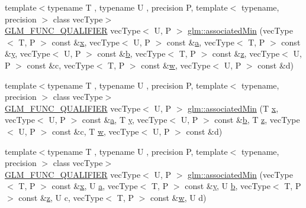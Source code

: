 \begin{DoxyCompactItemize}
{\footnotesize template$<$typename T , typename U , precision P, template$<$ typename, precision $>$ class vec\+Type$>$ }\\\mbox{\hyperlink{setup_8hpp_a33fdea6f91c5f834105f7415e2a64407}{G\+L\+M\+\_\+\+F\+U\+N\+C\+\_\+\+Q\+U\+A\+L\+I\+F\+I\+ER}} vec\+Type$<$ U, P $>$ \mbox{\hyperlink{group__gtx__associated__min__max_ga88e031f22b80215505928900d3dde549}{glm\+::associated\+Min}} (vec\+Type$<$ T, P $>$ const \&\mbox{\hyperlink{glad_8h_a92d0386e5c19fb81ea88c9f99644ab1d}{x}}, vec\+Type$<$ U, P $>$ const \&\mbox{\hyperlink{glad_8h_ac8729153468b5dcf13f971b21d84d4e5}{a}}, vec\+Type$<$ T, P $>$ const \&\mbox{\hyperlink{glad_8h_a66ddd433d2cacfe27f5906b7e86faeed}{y}}, vec\+Type$<$ U, P $>$ const \&\mbox{\hyperlink{glad_8h_a6eba317e3cf44d6d26c04a5a8f197dcb}{b}}, vec\+Type$<$ T, P $>$ const \&\mbox{\hyperlink{glad_8h_acb78bf1972d3eaf07da34ff2e0a2f133}{z}}, vec\+Type$<$ U, P $>$ const \&c, vec\+Type$<$ T, P $>$ const \&\mbox{\hyperlink{glad_8h_a1d0296e9e835f2e1ee17634af95fc1ec}{w}}, vec\+Type$<$ U, P $>$ const \&d)
\item 
{\footnotesize template$<$typename T , typename U , precision P, template$<$ typename, precision $>$ class vec\+Type$>$ }\\\mbox{\hyperlink{setup_8hpp_a33fdea6f91c5f834105f7415e2a64407}{G\+L\+M\+\_\+\+F\+U\+N\+C\+\_\+\+Q\+U\+A\+L\+I\+F\+I\+ER}} vec\+Type$<$ U, P $>$ \mbox{\hyperlink{group__gtx__associated__min__max_ga0f63b0dce5a5c3242cc6d9847e7d14f1}{glm\+::associated\+Min}} (T \mbox{\hyperlink{glad_8h_a92d0386e5c19fb81ea88c9f99644ab1d}{x}}, vec\+Type$<$ U, P $>$ const \&\mbox{\hyperlink{glad_8h_ac8729153468b5dcf13f971b21d84d4e5}{a}}, T \mbox{\hyperlink{glad_8h_a66ddd433d2cacfe27f5906b7e86faeed}{y}}, vec\+Type$<$ U, P $>$ const \&\mbox{\hyperlink{glad_8h_a6eba317e3cf44d6d26c04a5a8f197dcb}{b}}, T \mbox{\hyperlink{glad_8h_acb78bf1972d3eaf07da34ff2e0a2f133}{z}}, vec\+Type$<$ U, P $>$ const \&c, T \mbox{\hyperlink{glad_8h_a1d0296e9e835f2e1ee17634af95fc1ec}{w}}, vec\+Type$<$ U, P $>$ const \&d)
\item 
{\footnotesize template$<$typename T , typename U , precision P, template$<$ typename, precision $>$ class vec\+Type$>$ }\\\mbox{\hyperlink{setup_8hpp_a33fdea6f91c5f834105f7415e2a64407}{G\+L\+M\+\_\+\+F\+U\+N\+C\+\_\+\+Q\+U\+A\+L\+I\+F\+I\+ER}} vec\+Type$<$ U, P $>$ \mbox{\hyperlink{group__gtx__associated__min__max_ga00a949fd345f4b31b259f033d3ab4a1c}{glm\+::associated\+Min}} (vec\+Type$<$ T, P $>$ const \&\mbox{\hyperlink{glad_8h_a92d0386e5c19fb81ea88c9f99644ab1d}{x}}, U \mbox{\hyperlink{glad_8h_ac8729153468b5dcf13f971b21d84d4e5}{a}}, vec\+Type$<$ T, P $>$ const \&\mbox{\hyperlink{glad_8h_a66ddd433d2cacfe27f5906b7e86faeed}{y}}, U \mbox{\hyperlink{glad_8h_a6eba317e3cf44d6d26c04a5a8f197dcb}{b}}, vec\+Type$<$ T, P $>$ const \&\mbox{\hyperlink{glad_8h_acb78bf1972d3eaf07da34ff2e0a2f133}{z}}, U c, vec\+Type$<$ T, P $>$ const \&\mbox{\hyperlink{glad_8h_a1d0296e9e835f2e1ee17634af95fc1ec}{w}}, U d)

\end{DoxyCompactItemize}

